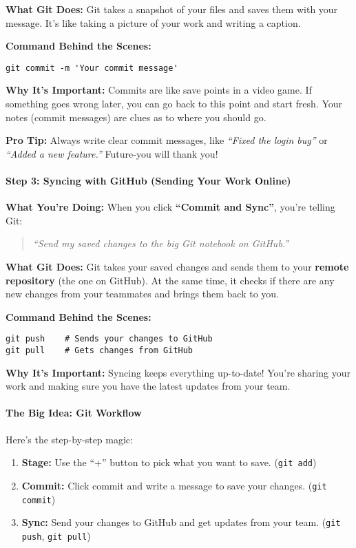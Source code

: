 \documentclass{ximera}
\begin{document}
\begin{multicols}{2}
    \textbf{What Git Does:}
    Git takes a snapshot of your files and saves them with your message. It's like
    taking a picture of your work and writing a caption.

    \textbf{Command Behind the Scenes:}
    \begin{verbatim}
git commit -m 'Your commit message'
\end{verbatim}

    \textbf{Why It's Important:}
    Commits are like save points in a video game. If something goes wrong later,
    you can go back to this point and start fresh. Your notes (commit messages) are clues as to where you should go.

    \textbf{Pro Tip:}
    Always write clear commit messages, like \emph{``Fixed the login bug''} or
    \emph{``Added a new feature.''} Future-you will thank you!

    \paragraph{Step 3: Syncing with GitHub (Sending Your Work Online)}

    \textbf{What You're Doing:}
    When you click \textbf{``Commit and Sync''}, you're telling Git:
    \begin{quote}
        \emph{``Send my saved changes to the big Git notebook on GitHub.''}
    \end{quote}

    \textbf{What Git Does:}
    Git takes your saved changes and sends them to your \textbf{remote repository}
    (the one on GitHub). At the same time, it checks if there are any new changes
    from your teammates and brings them back to you.

    \textbf{Command Behind the Scenes:}
    \begin{verbatim}
git push    # Sends your changes to GitHub
git pull    # Gets changes from GitHub
\end{verbatim}

    \textbf{Why It's Important:}
    Syncing keeps everything up-to-date! You're sharing your work and making sure
    you have the latest updates from your team.

    \paragraph{The Big Idea: Git Workflow}

    Here's the step-by-step magic:
    \begin{enumerate}
        \item \textbf{Stage:} Use the ``+'' button to pick what you want to save.
              (\texttt{git add})
        \item \textbf{Commit:} Click commit and write a message to save your
              changes. (\texttt{git commit})
        \item \textbf{Sync:} Send your changes to GitHub and get updates from your
              team. (\texttt{git push}, \texttt{git pull})
    \end{enumerate}


\end{multicols}
\end{document}
